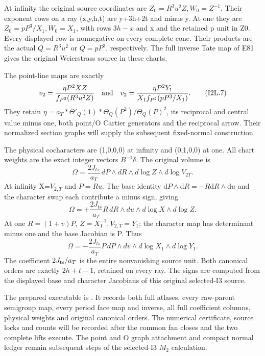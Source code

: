 \par\nobreak

At infinity the original source coordinates
are \(Z_{0}=R^{3}u^{2}Z,W_{0}=Z^{-1}\). Their exponent rows
on a ray (x,y,h,t) are y+3h+2t and minus y.
At one they are \(Z_{0}=pP^{3}/X_{1},W_{0}=X_{1}\), with
rows \(3h-x\) and x and the retained p unit
in Z0. Every displayed row is nonnegative
on every complete cone. Their products
are the actual \(Q=R^{3}u^{2}\) or \(Q=pP^{3}\),
respectively. The full inverse Tate map
of E81 gives the original Weierstrass
source in these charts.

The point-line maps are exactly
\[
 v_2=\frac{\eta P^2XZ}{f_{P^2}(R^3u^2Z)}
 \quad\hbox{and}\quad
 v_2=\frac{\eta P^2Y_1}{X_1 f_{P^2}(pP^3/X_1)}.
 \tag{I2L.7}
\]
They retain \(\eta=a_T*\Theta'_Q(1)*\Theta_Q(P^{2})/\Theta_Q(P)^{2}\),
its reciprocal and central value minus one, both point/O
Cartier generators and the reciprocal
arrow. Their normalized section graphs
will supply the subsequent fixed-normal
construction.

The physical cocharacters are (1,0,0,0)
at infinity and (0,1,0,0) at one. All
chart weights are the exact integer
vectors \(B^{-1} \delta\). The original volume is
\[
 \Omega=\frac{2J_{ts}}{a_T}\,
 dP\wedge dR\wedge d\log Z\wedge d\log V_{2T}.
 \tag{I2L.8}
\]
At infinity X=\(V_{2,T}\) and \(P=Ru\). The base
identity \(\mathrm dP\wedge \mathrm dR=-R \mathrm dR\wedge \mathrm du\)
and the character swap each contribute
a minus sign, giving
\[
 \Omega=+\frac{2J_{ts}}{a_T}R\,
 dR\wedge du\wedge d\log X\wedge d\log Z.
 \tag{I2L.9}
\]
At one \(R=(1+v)P\), \(Z=X_{1}^{-1},V_{2,T}=Y_{1}\);
the character map has determinant minus
one and the base Jacobian is P. Thus
\[
 \Omega=-\frac{2J_{ts}}{a_T}P\,
 dP\wedge dv\wedge d\log X_1\wedge d\log Y_1.
 \tag{I2L.10}
\]
The coefficient \(2J_{\rm ts}/a_T\) is the entire
nonvanishing source unit. Both canonical
orders are exactly \(2h+t-1\), retained on
every ray. The signs are computed from the displayed base and character
Jacobians of this original selected-I3 source.

The prepared executable is
.
It records both full atlases, every raw-parent semigroup map,
every period face map and inverse, all full coefficient columns,
physical weights and original canonical orders. The numerical
certificate, source locks and counts will be recorded after the
common fan closes and the two complete lifts execute. The point
and O graph attachment and compact normal ledger remain subsequent
steps of the selected-I3 \(M_{2}\) calculation.


